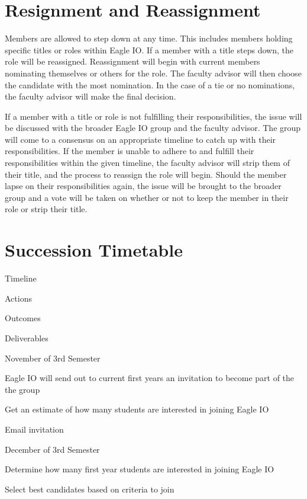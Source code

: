 \documentclass[
]{book}
\begin{document}
\hypertarget{resignment-and-reassignment}{%
\section{Resignment and Reassignment}\label{resignment-and-reassignment}}

Members are allowed to step down at any time. This includes members holding specific titles or roles within Eagle IO. If a member with a title steps down, the role will be reassigned. Reassignment will begin with current members nominating themselves or others for the role. The faculty advisor will then choose the candidate with the most nomination. In the case of a tie or no nominations, the faculty advisor will make the final decision.

If a member with a title or role is not fulfilling their responsibilities, the issue will be discussed with the broader Eagle IO group and the faculty advisor. The group will come to a consensus on an appropriate timeline to catch up with their responsibilities. If the member is unable to adhere to and fulfill their responsibilities within the given timeline, the faculty advisor will strip them of their title, and the process to reassign the role will begin. Should the member lapse on their responsibilities again, the issue will be brought to the broader group and a vote will be taken on whether or not to keep the member in their role or strip their title.

\hypertarget{timetable}{%
\section{Succession Timetable}\label{timetable}}

Timeline

Actions

Outcomes

Deliverables

November of 3rd Semester

Eagle IO will send out to current first years an invitation to become part of the the group

Get an estimate of how many students are interested in joining Eagle IO

Email invitation

December of 3rd Semester

Determine how many first year students are interested in joining Eagle IO

Select best candidates based on criteria to join
\end{document}
